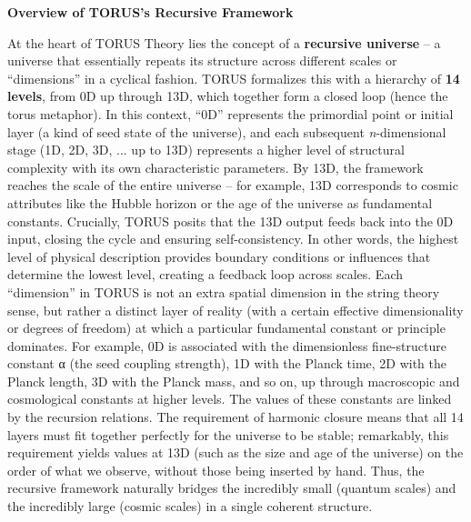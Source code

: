 \documentclass[]{article}
\begin{document}
\textbf{Overview of TORUS's Recursive Framework}

At the heart of TORUS Theory lies the concept of a \textbf{recursive
universe} -- a universe that essentially repeats its structure across
different scales or ``dimensions'' in a cyclical fashion. TORUS
formalizes this with a hierarchy of \textbf{14 levels}, from 0D up
through 13D, which together form a closed loop (hence the torus
metaphor). In this context, ``0D'' represents the primordial point or
initial layer (a kind of seed state of the universe), and each
subsequent \emph{n}-dimensional stage (1D, 2D, 3D, ... up to 13D)
represents a higher level of structural complexity with its own
characteristic parameters. By 13D, the framework reaches the scale of
the entire universe -- for example, 13D corresponds to cosmic attributes
like the Hubble horizon or the age of the universe as fundamental
constants. Crucially, TORUS posits that the 13D output feeds back into
the 0D input, closing the cycle and ensuring self-consistency. In other
words, the highest level of physical description provides boundary
conditions or influences that determine the lowest level, creating a
feedback loop across scales. Each ``dimension'' in TORUS is not an extra
spatial dimension in the string theory sense, but rather a distinct
layer of reality (with a certain effective dimensionality or degrees of
freedom) at which a particular fundamental constant or principle
dominates. For example, 0D is associated with the dimensionless
fine-structure constant α (the seed coupling strength), 1D with the
Planck time, 2D with the Planck length, 3D with the Planck mass, and so
on, up through macroscopic and cosmological constants at higher levels.
The values of these constants are linked by the recursion relations. The
requirement of harmonic closure means that all 14 layers must fit
together perfectly for the universe to be stable; remarkably, this
requirement yields values at 13D (such as the size and age of the
universe) on the order of what we observe, without those being inserted
by hand. Thus, the recursive framework naturally bridges the incredibly
small (quantum scales) and the incredibly large (cosmic scales) in a
single coherent structure.
\end{document}
